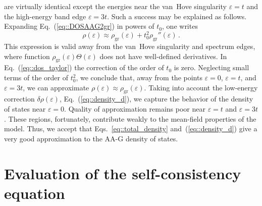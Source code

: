 \documentclass[prb,twocolumn,showpacs,aps,superscriptaddress,floatfix]{revtex4}
\begin{document}
are virtually identical except the energies near the van~Hove singularity
$\varepsilon = t$
and the high-energy band edge
$\varepsilon = 3t$.
Such a success may be explained as follows. Expanding
Eq.~(\ref{eq::DOSAAG2gr})
in powers of
$t_0$,
one writes
\begin{equation}
\label{eq::dos_taylor}
\rho(\varepsilon)
\approx
\rho_{\text{gr}}(\varepsilon)
+
t_0^2\rho_{\text{gr}}''(\varepsilon)\,.
\end{equation}
This expression is valid away from the van~Hove singularity and spectrum
edges, where function
$\rho_{\text{gr}}(\varepsilon) \Theta (\varepsilon)$
does not have well-defined derivatives. In
Eq.~(\ref{eq::dos_taylor})
the correction of the order of
$t_0$
is zero. Neglecting small terms of the order of
$t_0^2$,
we conclude that, away from the points
$\varepsilon = 0$,
$\varepsilon = t$,
and
$\varepsilon = 3t$,
we can approximate
$\rho(\varepsilon)\approx\rho_{\text{gr}}(\varepsilon)$.
Taking into account the low-energy correction
$\delta \rho (\varepsilon)$,
Eq.~(\ref{eq::density_d}),
we capture the behavior of the density of states near
$\varepsilon = 0$.
Quality of approximation remains poor near
$\varepsilon = t$
and
$\varepsilon = 3t$.
These regions, fortunately, contribute weakly to the mean-field properties
of the model. Thus, we accept that
Eqs.~\eqref{eq::total_density}
and~(\ref{eq::density_d})
give a very good approximation to the AA-G density of states.

\section{Evaluation of the self-consistency equation}
\label{app::selfconsist}
\end{document}
